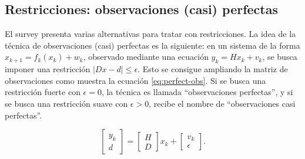 


\subsection{Restricciones: observaciones (casi) perfectas} \label{casiperfect}

El survey \cite{Simon2010} presenta varias alternativas para tratar con restricciones. La idea de la técnica de observaciones (casi) perfectas es la siguiente: en un sistema de la forma \(x_{k+1} = f_k(x_k) + w_k\), observado mediante una ecuación \(y_k = Hx_k + v_k \), se busca imponer una restricción \(|Dx - d| \leq \epsilon\). Esto se consigue ampliando la matriz de observaciones como muestra la ecuación \ref{eq:perfect-obs}. Si se busca una restricción fuerte con \(\epsilon = 0\), la técnica es llamada ``observaciones perfectas'', y si se busca una restricción suave con \(\epsilon > 0\), recibe el nombre de ``observaciones casi perfectas''.


\begin{equation}\label{eq:perfect-obs}
\begin{bmatrix}
y_k \\
d 
\end{bmatrix} = 
\begin{bmatrix}
H \\
D
\end{bmatrix} x_k
+
\begin{bmatrix}
v_k \\
\epsilon  
\end{bmatrix}.
\end{equation}










